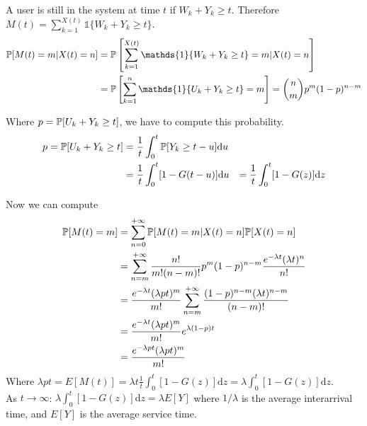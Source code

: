 A user is still in the system at time $t$ if $W_k + Y_k \geq t$. Therefore $M(t) = \sum\limits_{k=1}^{X(t)} \mathds{1}\{W_k + Y_k \geq t\} $.
\begin{equation}
	\begin{split}
		\prob[M(t)=m|X(t)=n] &= \prob\left[\sum\limits_{k=1}^{X(t)} \mathds{1}\{W_k + Y_k \geq t\} = m|X(t)=n\right] \\
		&= \prob\left[\sum\limits_{k=1}^{n} \mathds{1}\{U_k + Y_k \geq t\}=m \right] = {{n}\choose{m}}p^{m}(1-p)^{n-m}
	\end{split}
\end{equation}

Where $p = \mathbb{P}[U_k + Y_k \geq t]$, we have to compute this probability.
\begin{equation}
	\begin{split}
	 p = \mathbb{P}[U_k + Y_k \geq t] &= \frac{1}{t}\int_0^t \mathbb{P}[Y_k \geq t -u] \mathrm{d}u \\
	 &= \frac{1}{t}\int_0^t [1 - G(t-u)] \mathrm{d}u
	 &= \frac{1}{t}\int_0^t [1 - G(z)] \mathrm{d}z
	\end{split}
\end{equation}

Now we can compute
\begin{equation}
	\begin{split}
		\mathbb{P}[M(t)=m] &= \sum\limits_{n=0}^{+\infty} \mathbb{P}[M(t)=m|X(t)=n]\mathbb{P}[X(t)=n] \\
		&= \sum\limits_{n=m}^{+\infty} \frac{n!}{m!(n-m)!}p^m(1-p)^{n-m}\frac{e^{-\lambda t} (\lambda t)^n}{n!} \\
		&= \frac{e^{-\lambda t} (\lambda p t)^m}{m!}\sum\limits_{n=m}^{+\infty} \frac{(1-p)^{n-m}(\lambda t)^{n-m}}{(n-m)!}\\
		&= \frac{e^{-\lambda t} (\lambda p t)^m}{m!} e^{\lambda(1-p)t}\\
		&= \frac{e^{-\lambda p t}(\lambda p t)^m}{m!}
	\end{split}
\end{equation}
Where $\lambda p t = E[M(t)] = \lambda t \frac{1}{t} \int_0^t [1 - G(z)] \mathrm{d}z = \lambda \int_0^t [1 - G(z)] \mathrm{d}z$. \\
As $t \rightarrow \infty$: $\lambda \int_0^t [1 - G(z)] \mathrm{d}z = \lambda E[Y]$ where $1/\lambda$ is the average interarrival time, and $E[Y]$ is the average service time.


